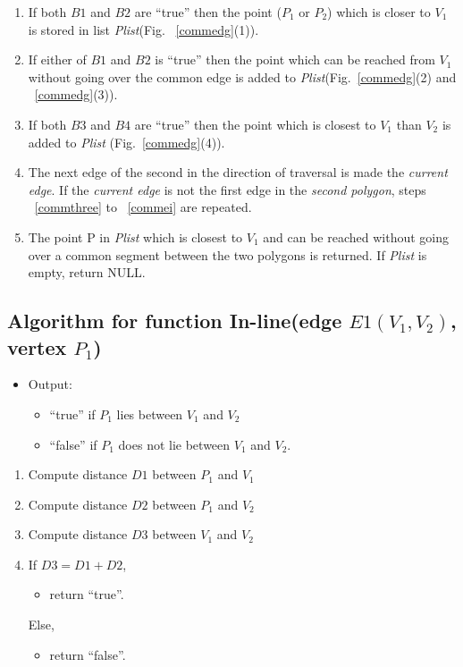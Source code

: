 \begin{enumerate}
	\item
	If both $B1$ and $B2$ are ``true'' then the point ($P_{1}$ or $P_{2}$)
	which is closer to $V_{1}$ is stored in list {\em Plist}(Fig.
	~\ref{commedg}(1)). 
	\item
	If either of $B1$ and $B2$ is ``true'' 
	then the point which can be reached from $V_{1}$ without going over the
	common edge is added to {\em Plist}(Fig.~\ref{commedg}(2) and 
	~\ref{commedg}(3)).

	\item
	\label{commfive}
	If both $B3$ and $B4$ are ``true'' then the point
	which is closest to $V_{1}$ than $V_{2}$ is added to {\em Plist}
	(Fig.~\ref{commedg}(4)).
	\item
	\label{commei}
	The next edge of the second in the direction of traversal is made the 
	{\em current edge}.
	If the {\em current edge} is not the first edge in the {\em second polygon},
	steps ~\ref{commthree} to ~\ref{commei} are repeated.

	\item
	The point P in {\em Plist} which is closest to $V_{1}$ and can be reached
	without going over a common segment between the two polygons is returned. 
	If {\em Plist} is empty, return NULL.

	\end{enumerate}

	\subsection{Algorithm for function In-line(edge $E1 (V_{1},V_{2})$,
	vertex $P_{1}$)}
	\label{inline}
	\begin{itemize}
	\item 
	Output: 
			\begin{itemize}
			\item 
			``true'' if $P_{1}$ lies between $V_{1}$ and $V_{2}$
			\item
			``false'' if $P_{1}$ does not lie between $V_{1}$ and $V_{2}$.
			\end{itemize}
	\end{itemize}

    \begin{enumerate}
        \item
        Compute distance $D1$ between $P_{1}$ and $V_{1}$
        \item
        Compute distance $D2$ between $P_{1}$ and $V_{2}$
        \item
        Compute distance $D3$ between $V_{1}$ and $V_{2}$
        \item
        If $ D3 = D1 + D2 $, 
			\begin{itemize}
			\item return ``true''. 
			\end{itemize}
		Else,
			\begin{itemize}
			\item return ``false''. 
			\end{itemize}
    \end{enumerate}


